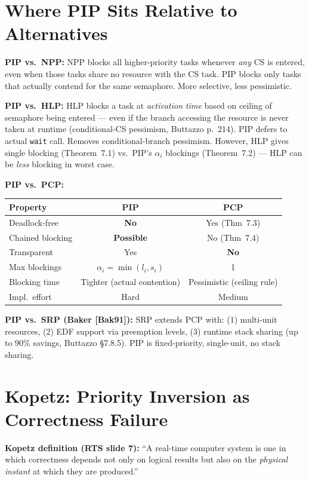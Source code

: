 \documentclass[conference,onecolumn]{IEEEtran}
\begin{document}
\section{Where PIP Sits Relative to Alternatives}

\textbf{PIP vs.\ NPP:}
NPP blocks all higher-priority tasks whenever \emph{any} CS is entered,
even when those tasks share no resource with the CS task.
PIP blocks only tasks that actually contend for the same semaphore.
More selective, less pessimistic.

\textbf{PIP vs.\ HLP:}
HLP blocks a task at \emph{activation time} based on ceiling of semaphore
being entered --- even if the branch accessing the resource is never taken
at runtime (conditional-CS pessimism, Buttazzo p.~214).
PIP defers to actual \texttt{wait} call. Removes conditional-branch pessimism.
However, HLP gives single blocking (Theorem~7.1) vs.\ PIP's $\alpha_i$
blockings (Theorem~7.2) --- HLP can be \emph{less} blocking in worst case.

\textbf{PIP vs.\ PCP:}

{\small\begin{tabular}{@{}lcc@{}}
\toprule
Property & PIP & PCP \\
\midrule
Deadlock-free & \textbf{No} & Yes (Thm~7.3) \\
Chained blocking & \textbf{Possible} & No (Thm~7.4) \\
Transparent & Yes & \textbf{No} \\
Max blockings & $\alpha_i = \min(l_i,s_i)$ & 1 \\
Blocking time & Tighter (actual contention) & Pessimistic (ceiling rule) \\
Impl.\ effort & Hard & Medium \\
\bottomrule
\end{tabular}}

\textbf{PIP vs.\ SRP (Baker [Bak91]):}
SRP extends PCP with: (1) multi-unit resources, (2) EDF support via
preemption levels, (3) runtime stack sharing (up to 90\% savings,
Buttazzo \S7.8.5). PIP is fixed-priority, single-unit, no stack sharing.

\section{Kopetz: Priority Inversion as Correctness Failure}

\textbf{Kopetz definition (RTS slide 7):}
``A real-time computer system is one in which correctness depends
not only on logical results but also on the \emph{physical instant}
at which they are produced.''
\end{document}
